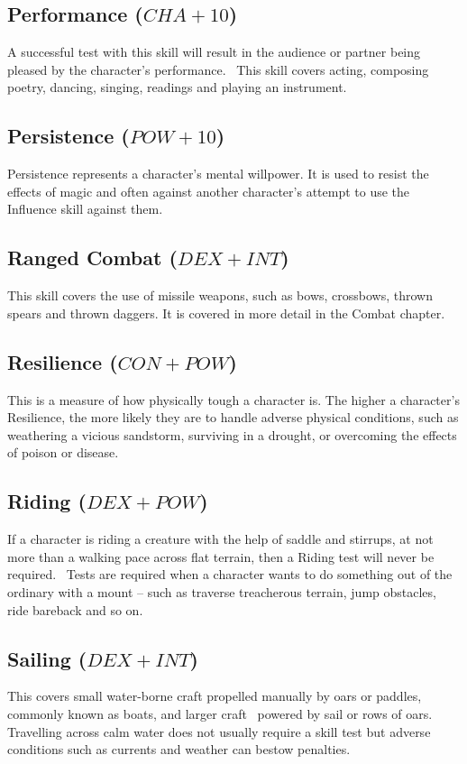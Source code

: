 \subsection{Performance ($CHA+10$)}
A successful test with this skill will result in the audience or partner being pleased by the character’s performance.  This skill covers acting, composing poetry, dancing, singing, readings and playing an instrument. 

\subsection{Persistence ($POW+10$)}
Persistence represents a character’s mental willpower. It is used to resist the effects of magic and often against another character’s attempt to use the Influence skill against them.  

\subsection{Ranged Combat ($DEX+INT$)}
This skill covers the use of missile weapons, such as bows, crossbows, thrown spears and thrown daggers. It is covered in more detail in the Combat chapter.

\subsection{Resilience ($CON+POW$)}
This is a measure of how physically tough a character is. The higher a character’s Resilience, the more likely they are to handle adverse physical conditions, such as weathering a vicious sandstorm, surviving in a drought, or overcoming the effects of poison or disease. 


\subsection{Riding ($DEX+POW$)}
If a character is riding a creature with the help of saddle and stirrups, at not more than a walking pace across flat terrain, then a Riding test will never be required.  Tests are required when a character wants to do something out of the ordinary with a mount – such as traverse treacherous terrain, jump obstacles, ride bareback and so on. 



\subsection{Sailing ($DEX+INT$)}
This covers small water-borne craft propelled manually by oars or paddles, commonly known as boats, and larger craft  powered by sail or rows of oars. Travelling across calm water does not usually require a skill test but adverse conditions such as currents and weather can bestow penalties. 

